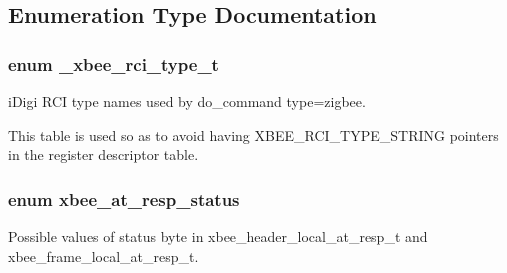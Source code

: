 \subsection{Enumeration Type Documentation}
\hypertarget{group__xbee__atcmd_gaa874b4a291f79f2e80f867ce71fccea5}{
\subsubsection[{\-\_\-xbee\-\_\-rci\-\_\-type\-\_\-t}]{\setlength{\rightskip}{0pt plus 5cm}enum {\bf \-\_\-xbee\-\_\-rci\-\_\-type\-\_\-t}}}\label{group__xbee__atcmd_gaa874b4a291f79f2e80f867ce71fccea5}


i\-Digi R\-C\-I type names used by do\-\_\-command type=zigbee. 

This table is used so as to avoid having X\-B\-E\-E\-\_\-\-R\-C\-I\-\_\-\-T\-Y\-P\-E\-\_\-\-S\-T\-R\-I\-N\-G pointers in the register descriptor table. \hypertarget{group__xbee__atcmd_gac6a27f1b1ee32b75b6f966afbb347f22}{
\subsubsection[{xbee\-\_\-at\-\_\-resp\-\_\-status}]{\setlength{\rightskip}{0pt plus 5cm}enum {\bf xbee\-\_\-at\-\_\-resp\-\_\-status}}}\label{group__xbee__atcmd_gac6a27f1b1ee32b75b6f966afbb347f22}


Possible values of {\ttfamily status} byte in xbee\-\_\-header\-\_\-local\-\_\-at\-\_\-resp\-\_\-t and xbee\-\_\-frame\-\_\-local\-\_\-at\-\_\-resp\-\_\-t. 

